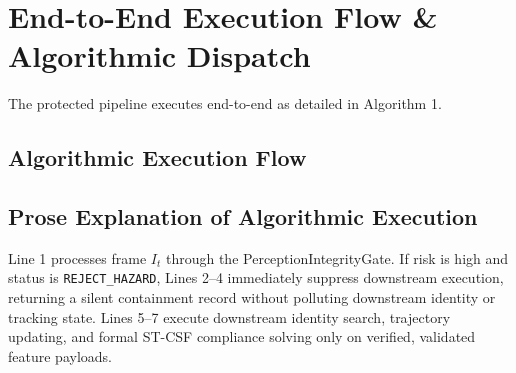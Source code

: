 \documentclass[conference]{IEEEtran}
\begin{document}
\section{End-to-End Execution Flow & Algorithmic Dispatch}
The protected pipeline executes end-to-end as detailed in Algorithm 1.

\subsection{Algorithmic Execution Flow}
\begin{center}
\end{center}

\subsection{Prose Explanation of Algorithmic Execution}
Line 1 processes frame $I_t$ through the PerceptionIntegrityGate. If risk is high and status is \texttt{REJECT\_HAZARD}, Lines 2--4 immediately suppress downstream execution, returning a silent containment record without polluting downstream identity or tracking state. Lines 5--7 execute downstream identity search, trajectory updating, and formal ST-CSF compliance solving only on verified, validated feature payloads.
\end{document}
